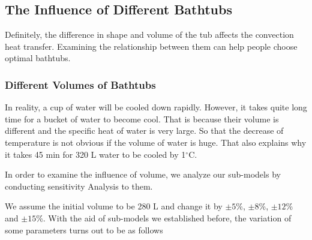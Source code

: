 \documentclass{mcmthesis}
\begin{document}
\subsection{The Influence of Different Bathtubs}

Definitely, the difference in shape and volume of the tub affects the
convection heat transfer. Examining the relationship between them can help
people choose optimal bathtubs.

\subsubsection{Different Volumes of Bathtubs}

In reality, a cup of water will be cooled down rapidly. However, it takes quite long time for a bucket of water to become cool. That is because their volume is different and the specific heat of water is very large. So that the decrease of temperature is not obvious if the volume of water is huge. That also explains why it takes 45 min for 320 L water to be cooled by 1$^\circ$C.

In order to examine the influence of volume, we analyze our sub-models
by conducting sensitivity Analysis to them.

We assume the initial volume to be 280 L and change it by $\pm 5$\%, $\pm 8$\%, $\pm 12$\% and $\pm 15$\%. With the aid of sub-models we established before, the variation of some parameters turns out to be as follows
\end{document}
